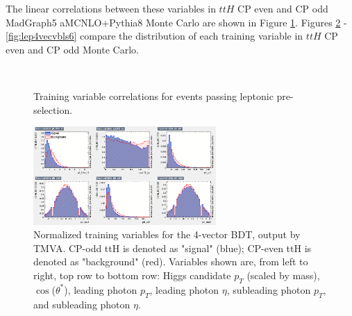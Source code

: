 The linear correlations between these variables in $ttH$ CP even and CP odd MadGraph5 aMCNLO+Pythia8 Monte Carlo are shown in Figure \ref{fig:lepcorr4vec}.  Figures \ref{fig:lep4vecvbls1} - \ref{fig:lep4vecvbls6} compare the distribution of each training variable in $ttH$ CP even and CP odd Monte Carlo.

\begin{figure}[htbp]
  \centering
    \\
 \caption{Training variable correlations for events passing leptonic pre-selection.}
  \label{fig:lepcorr4vec}
\end{figure}

\begin{figure}[htbp]
  \centering
  \includegraphics[width=0.62\textwidth]{figures/TMVABDTStudies/lep-vbls4vec/lep4vecvbls1.png}
  \caption{Normalized training variables for the 4-vector BDT, output by TMVA. CP-odd ttH is denoted as "signal" (blue); CP-even ttH is denoted as "background" (red). Variables shown are, from left to right, top row to bottom row: Higgs candidate $p_{T}$ (scaled by mass), $\cos$($\theta^{*}$), leading photon $p_{T}$, leading photon $\eta$, subleading photon $p_{T}$, and subleading photon $\eta$.}
  \label{fig:lep4vecvbls1}
\end{figure}

